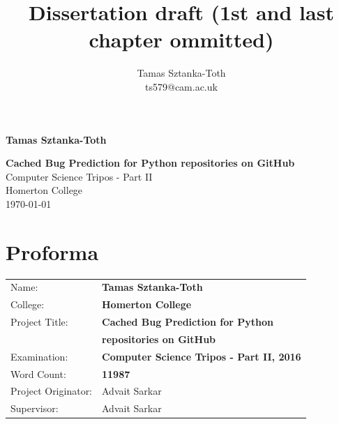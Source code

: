\documentclass[12pt,twoside,notitlepage]{report}
\title{Dissertation draft (1st and last chapter ommitted)}
\author{Tamas Sztanka-Toth \\ ts579@cam.ac.uk}
\begin{document}
\setcounter{page}{1}
\pagestyle{plain}



\pagestyle{empty}

\hfill{\LARGE \bf Tamas Sztanka-Toth}

\vspace*{60mm}
\begin{center}
\Huge
{\bf Cached Bug Prediction for Python repositories on GitHub} \\
\vspace*{5mm}
Computer Science Tripos - Part II \\
\vspace*{5mm}
Homerton College \\
\vspace*{5mm}
\today  %
\end{center}

\cleardoublepage


\setcounter{page}{1}
\pagestyle{plain}

\chapter*{Proforma}

{\large
\begin{tabular}{ll}
Name:               & \bf Tamas Sztanka-Toth                       \\
College:            & \bf Homerton College                     \\
Project Title:      & \bf Cached Bug Prediction for Python\\ 						& \bf repositories on GitHub \\
Examination:        & \bf Computer Science Tripos - Part II, 2016        \\
Word Count:         & \bf 11987\footnotemark[1]				 \\
Project Originator: & Advait Sarkar                \\
Supervisor:         & Advait Sarkar                    \\ 
\end{tabular}
}
\end{document}
